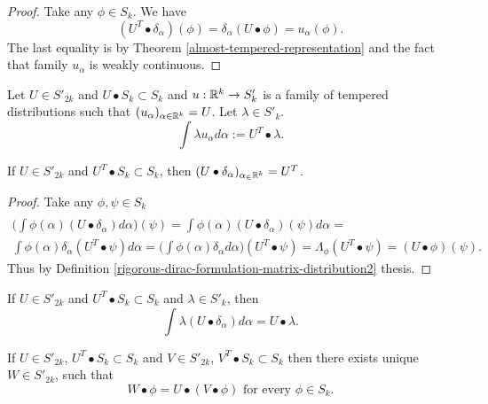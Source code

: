 \documentclass[main.tex]{subfiles}
\begin{document}
\begin{proof}
Take any $\phi\in S_k$. We have
\begin{equation}
(U^T \bullet \delta_\alpha)(\phi) = \delta_\alpha(U\bullet \phi) = u_\alpha(\phi).
\end{equation}
The last equality is by Theorem \ref{almost-tempered-representation} and the fact that family $u_\alpha$ is weakly continuous.
\end{proof}
\begin{definition}
\label{distribution-parametrised-integral}
Let $U\in S'_{2k}$ and $U\bullet S_k \subset S_k$ and $u:\mathbb{R}^k\to S'_k$ is a family of tempered distributions such that $(u_\alpha)_{\alpha\in\mathbb{R}^k} = U$. Let $\lambda \in S'_k$.
\begin{equation}
\int \lambda u_\alpha d\alpha := U^T\bullet \lambda.
\end{equation}
\end{definition}
\begin{theorem}
If $U\in S'_{2k}$ and $U^T\bullet S_k \subset S_k$, then $(U\bullet \delta_\alpha)_{\alpha_\in\mathbb{R}^k} = U^T$.
\end{theorem}
\begin{proof}
Take any $\phi, \psi\in S_k$
\begin{multline}\\
\bigg(\int \phi(\alpha)(U\bullet \delta_\alpha)d\alpha\bigg)(\psi) =  \int \phi(\alpha)(U\bullet \delta_\alpha)(\psi) d\alpha = \\
\int \phi(\alpha) \delta_\alpha(U^T\bullet \psi) d\alpha = \bigg(\int \phi(\alpha) \delta_\alpha d\alpha\bigg)(U^T\bullet \psi) = \Lambda_\phi(U^T\bullet \psi) = (U \bullet \phi)(\psi).
\end{multline}
Thus by Definition \ref{rigorous-dirac-formulation-matrix-distribution2} thesis.
\end{proof}
\begin{corollary}
If $U\in S'_{2k}$ and $U^T\bullet S_k \subset S_k$ and $\lambda\in S'_k$, then
\begin{equation}
\int \lambda (U\bullet\delta_\alpha) d\alpha = U\bullet \lambda.
\end{equation}
\end{corollary}
\begin{theorem}
If $U\in S'_{2k}$, $U^T\bullet S_k \subset S_k$ and $V\in S'_{2k}$, $V^T\bullet S_k \subset S_k$ then there exists unique $W\in S'_{2k}$, such that
\begin{equation}
W \bullet \phi = U \bullet (V \bullet \phi) \text{ for every } \phi\in S_k. 
\end{equation}
\end{theorem}
\end{document}
